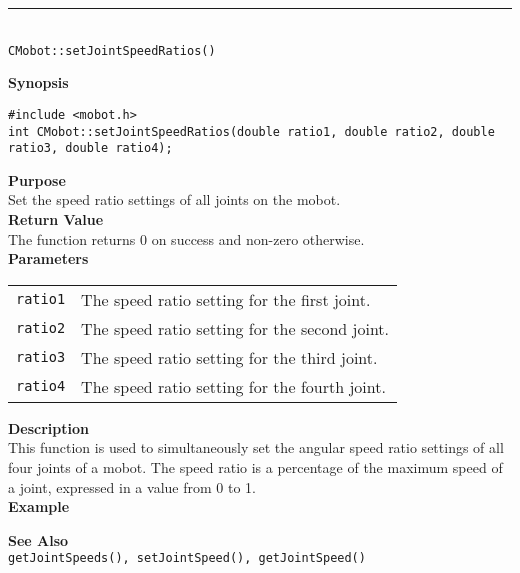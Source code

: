 \noindent
\vspace{5pt}
\rule{4.5in}{0.015in}\\
\noindent
{\LARGE \texttt{CMobot::setJointSpeedRatios()}}\\
{}

\noindent
{\bf Synopsis}
\vspace{-8pt}
\begin{verbatim}
#include <mobot.h>
int CMobot::setJointSpeedRatios(double ratio1, double ratio2, double ratio3, double ratio4);
\end{verbatim}

\noindent
{\bf Purpose}\\
Set the speed ratio settings of all joints on the mobot.\\

\noindent
{\bf Return Value}\\
The function returns 0 on success and non-zero otherwise.\\

\noindent
{\bf Parameters}
\vspace{-0.1in}
\begin{description}
\item               
\begin{tabular}{p{10 mm}p{145 mm}}
\texttt{ratio1} & The speed ratio setting for the first joint. \\ 
\texttt{ratio2} & The speed ratio setting for the second joint. \\
\texttt{ratio3} & The speed ratio setting for the third joint. \\
\texttt{ratio4} & The speed ratio setting for the fourth joint. \\
\end{tabular}
\end{description}

\noindent
{\bf Description}\\
This function is used to simultaneously set the angular speed ratio settings of
all four joints of a mobot. The speed ratio is a percentage of the maximum
speed of a joint, expressed in a value from 0 to 1.\\

\noindent
{\bf Example}\\
\noindent

\noindent
{\bf See Also}\\
\texttt{getJointSpeeds(), setJointSpeed(), getJointSpeed()}

